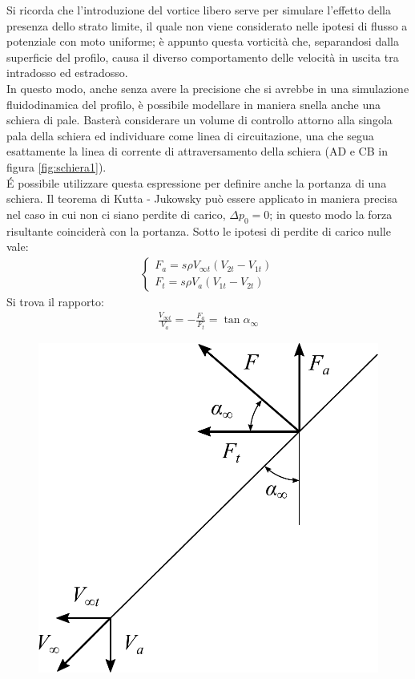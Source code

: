 Si ricorda che l'introduzione del vortice libero serve per simulare l'effetto della presenza dello strato limite, il quale non viene considerato nelle ipotesi di flusso a potenziale con moto uniforme; è appunto questa vorticità che, separandosi dalla superficie del profilo, causa il diverso comportamento delle velocità in uscita tra intradosso ed estradosso.\\
In questo modo, anche senza avere la precisione che si avrebbe in una simulazione fluidodinamica del profilo, è possibile modellare in maniera snella anche una schiera di pale. Basterà considerare un volume di controllo attorno alla singola pala della schiera ed individuare come linea di circuitazione, una che segua esattamente la linea di corrente di attraversamento della schiera (AD e CB in figura \ref{fig:schiera1}).\\
\'E possibile utilizzare questa espressione per definire anche la portanza di una schiera. Il teorema di Kutta - Jukowsky può essere applicato in maniera precisa nel caso in cui non ci siano perdite di carico, $\Delta p_0=0$; in questo modo la forza risultante coinciderà con la portanza. Sotto le ipotesi di perdite di carico nulle vale:
\begin{align*}
\begin{cases}
F_a = s \rho V_{\infty t} (V_{2t}-V_{1t})\\
F_t = s \rho V_a (V_{1t}-V_{2t})
\end{cases}
\end{align*}
Si trova il rapporto:
\begin{align*}
	\frac{V_{\infty t}}{V_a}=-\frac{F_a}{F_t} = \tan \alpha_{\infty}
\end{align*}
\begin{figure}
	\centering
	\begin{minipage}{.4\textwidth}
		\centering
		\includegraphics[width=.95\linewidth]{fig/forzaKJ.pdf}
		\label{fig:forzaKJ}
	\end{minipage}
\end{figure}
